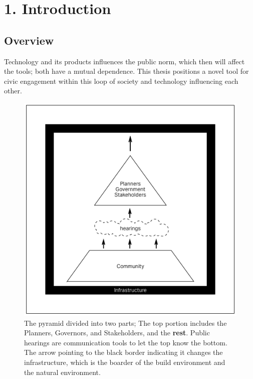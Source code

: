 \chapter{1. Introduction}

\section{Overview}
\justify
Technology and its products influences the public norm, which then will affect the tools; both have a mutual dependence.
This thesis positions a novel tool for civic engagement within this loop of society and technology influencing each other. 

\begin{figure}[!htb]
 	\includegraphics[width=\textwidth]{chapters/1/fig/hearings.png}               
 	 \caption[diagram: community hearings]{The pyramid divided into two parts; The top portion includes the Planners, Governors, and Stakeholders, and the \textbf{rest}. Public hearings are communication tools to let the top know the bottom. The arrow pointing to the black border indicating it changes the infrastructure, which is the boarder of the build environment and the natural environment.}
  	\label{fig:hearings}
\end{figure}

